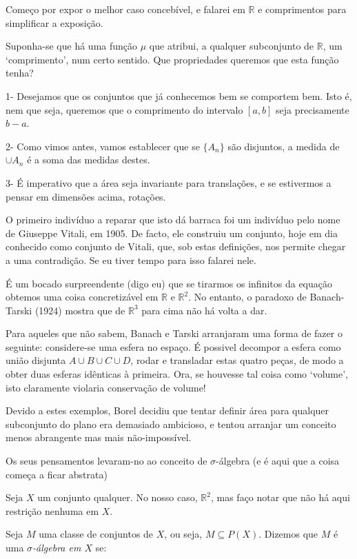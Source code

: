 \documentclass{article}
\newcommand{\R}{\mathbb{R}}
\begin{document}
Começo por expor o melhor caso concebível, e falarei em $\R$ e comprimentos para simplificar a exposição.

Suponha-se que há uma função $\mu$ que atribui, a qualquer subconjunto de $\R$, um `comprimento', num certo sentido. Que propriedades queremos que esta função tenha?

1- Desejamos que os conjuntos que já conhecemos bem se comportem bem. Isto é, nem que seja, queremos que o comprimento do intervalo $[a,b]$ seja precisamente $b-a$.

2- Como vimos antes, vamos establecer que se $\{A_n\}$ são disjuntos, a medida de $\cup A_n$ é a soma das medidas destes.

3- É imperativo que a área seja invariante para translações, e se estivermos a pensar em dimensões acima, rotações.

O primeiro indivíduo a reparar que isto dá barraca foi um indivíduo pelo nome de Giuseppe Vitali, em 1905. De facto, ele construiu um conjunto, hoje em dia conhecido como conjunto de Vitali, que, sob estas definições, nos permite chegar a uma contradição. Se eu tiver tempo para isso falarei nele.

É um bocado surpreendente (digo eu) que se tirarmos os infinitos da equação obtemos uma coisa concretizável em $\R$ e $\R^2$. No entanto, o paradoxo de Banach-Tarski (1924) mostra que de $\R^3$ para cima não há volta a dar.

Para aqueles que não sabem, Banach e Tarski arranjaram uma forma de fazer o seguinte: considere-se uma esfera no espaço. É possivel decompor a esfera como união disjunta $A \cup B \cup C \cup D$, rodar e transladar estas quatro peças, de modo a obter duas esferas idênticas à primeira. Ora, se houvesse tal coisa como `volume', isto claramente violaria conservação de volume!

Devido a estes exemplos, Borel decidiu que tentar definir área para qualquer subconjunto do plano era demasiado ambicioso, e tentou arranjar um conceito menos abrangente mas mais não-impossível.


Os seus pensamentos levaram-no ao conceito de $\sigma$-álgebra (e é aqui que a coisa começa a ficar abstrata)

Seja $X$ um conjunto qualquer. No nosso caso, $\R^2$, mas faço notar que não há aqui restrição nenhuma em $X$.

Seja $M$ uma classe de conjuntos de $X$, ou seja, $M \subseteq P(X)$. Dizemos que $M$ é uma \emph{$\sigma$-álgebra em $X$} se:
\end{document}
